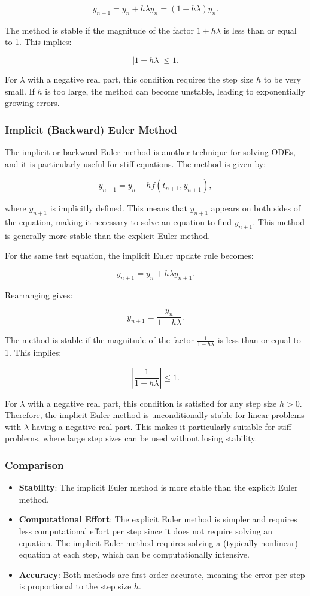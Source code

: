 \documentclass[a4paper,12pt,french]{article}
\begin{document}
\[
y_{n+1} = y_n + h \lambda y_n = (1 + h \lambda) y_n.
\]

The method is stable if the magnitude of the factor \(1 + h \lambda\) is less than or equal to 1. This implies:

\[
|1 + h \lambda| \leq 1.
\]

For \(\lambda\) with a negative real part, this condition requires the step size \(h\) to be very small. If \(h\) is too large, the method can become unstable, leading to exponentially growing errors.

\subsubsection{Implicit (Backward) Euler Method}
The implicit or backward Euler method is another technique for solving ODEs, and it is particularly useful for stiff equations. The method is given by:

\[
y_{n+1} = y_n + h f(t_{n+1}, y_{n+1}),
\]

where \(y_{n+1}\) is implicitly defined. This means that \(y_{n+1}\) appears on both sides of the equation, making it necessary to solve an equation to find \(y_{n+1}\). This method is generally more stable than the explicit Euler method.

For the same test equation, the implicit Euler update rule becomes:

\[
y_{n+1} = y_n + h \lambda y_{n+1}.
\]

Rearranging gives:

\[
y_{n+1} = \frac{y_n}{1 - h \lambda}.
\]

The method is stable if the magnitude of the factor \( \frac{1}{1 - h \lambda} \) is less than or equal to 1. This implies:

\[
\left| \frac{1}{1 - h \lambda} \right| \leq 1.
\]

For \(\lambda\) with a negative real part, this condition is satisfied for any step size \(h > 0\). Therefore, the implicit Euler method is unconditionally stable for linear problems with \(\lambda\) having a negative real part. This makes it particularly suitable for stiff problems, where large step sizes can be used without losing stability.

\subsubsection*{Comparison}

\begin{itemize}
    \item \textbf{Stability}: The implicit Euler method is more stable than the explicit Euler method.
    \item \textbf{Computational Effort}: The explicit Euler method is simpler and requires less computational effort per step since it does not require solving an equation. The implicit Euler method requires solving a (typically nonlinear) equation at each step, which can be computationally intensive.
    \item \textbf{Accuracy}: Both methods are first-order accurate, meaning the error per step is proportional to the step size \(h\).
\end{itemize}
\end{document}
